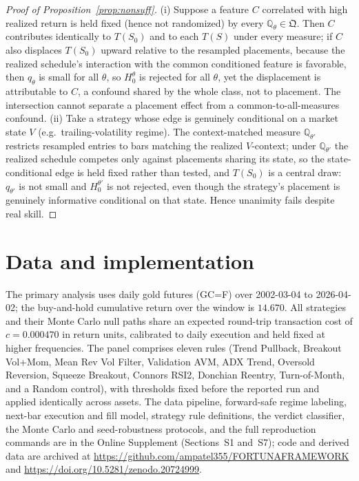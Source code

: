 \documentclass[preprint,12pt]{elsarticle}
\theoremstyle{definition}
\begin{document}
\begin{proof}[Proof of Proposition~\ref{prop:nonsuff}]
(i) Suppose a feature $C$ correlated with high realized return is held fixed
(hence not randomized) by every $\mathbb{Q}_\theta\in\mathfrak Q$. Then $C$
contributes identically to $T(S_0)$ and to each $T(S)$ under every measure; if $C$
also displaces $T(S_0)$ upward relative to the resampled placements, because the
realized schedule's interaction with the common conditioned feature is
favorable, then $q_\theta$ is small for all $\theta$, so $H_0^\theta$ is rejected
for all $\theta$, yet the displacement is attributable to $C$, a confound shared
by the whole class, not to placement. The intersection cannot separate a
placement effect from a common-to-all-measures confound. (ii) Take a strategy
whose edge is genuinely conditional on a market state $V$ (e.g.\
trailing-volatility regime). The context-matched measure $\mathbb{Q}_{\theta'}$
restricts resampled entries to bars matching the realized $V$-context; under
$\mathbb{Q}_{\theta'}$ the realized schedule competes only against placements
sharing its state, so the state-conditional edge is held fixed rather than tested,
and $T(S_0)$ is a central draw: $q_{\theta'}$ is not small and $H_0^{\theta'}$ is
not rejected, even though the strategy's placement is genuinely informative
conditional on that state. Hence unanimity fails despite real skill.
\end{proof}

\section{Data and implementation}
\label{app:data}

The primary analysis uses daily gold futures (GC=F) over 2002-03-04 to 2026-04-02;
the buy-and-hold cumulative return over the window is $14.670$. All strategies and
their Monte Carlo null paths share an expected round-trip transaction cost of
$c=0.000470$ in return units, calibrated to daily execution and held fixed at higher
frequencies. The panel comprises eleven rules (Trend Pullback, Breakout Vol+Mom,
Mean Rev Vol Filter, Validation AVM, ADX Trend, Oversold Reversion, Squeeze
Breakout, Connors RSI2, Donchian Reentry, Turn-of-Month, and a Random control), with
thresholds fixed before the reported run and applied identically across assets. The
data pipeline, forward-safe regime labeling, next-bar execution and fill model,
strategy rule definitions, the verdict classifier, the Monte Carlo and seed-robustness
protocols, and the full reproduction commands are in the Online Supplement
(Sections~S1 and~S7); code and derived data are archived at
\url{https://github.com/ampatel355/FORTUNAFRAMEWORK} and \url{https://doi.org/10.5281/zenodo.20724999}.
\end{document}
